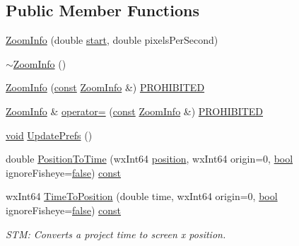 \subsection*{Public Member Functions}
\begin{DoxyCompactItemize}
\item 
\hyperlink{class_zoom_info_a873097fea0bcd18e29151c5b1ab540e1}{Zoom\+Info} (double \hyperlink{seqread_8c_ac503262ae470564980711da4f78b1181}{start}, double pixels\+Per\+Second)
\item 
\hyperlink{class_zoom_info_aa75d0466755ec5d88c0b0c83d150cb3c}{$\sim$\+Zoom\+Info} ()
\item 
\hyperlink{class_zoom_info_a96347b04310289f36523d976241681c3}{Zoom\+Info} (\hyperlink{getopt1_8c_a2c212835823e3c54a8ab6d95c652660e}{const} \hyperlink{class_zoom_info}{Zoom\+Info} \&) \hyperlink{_theme_8cpp_a035607ad9a746b2bf967980a50dd35db}{P\+R\+O\+H\+I\+B\+I\+T\+ED}
\item 
\hyperlink{class_zoom_info}{Zoom\+Info} \& \hyperlink{class_zoom_info_a9d29194b0340b81505c537409481bd4c}{operator=} (\hyperlink{getopt1_8c_a2c212835823e3c54a8ab6d95c652660e}{const} \hyperlink{class_zoom_info}{Zoom\+Info} \&) \hyperlink{_theme_8cpp_a035607ad9a746b2bf967980a50dd35db}{P\+R\+O\+H\+I\+B\+I\+T\+ED}
\item 
\hyperlink{sound_8c_ae35f5844602719cf66324f4de2a658b3}{void} \hyperlink{class_zoom_info_a526e25124bc79b115e8c72d921e56b70}{Update\+Prefs} ()
\item 
double \hyperlink{class_zoom_info_aa7e0fefa3365826150c253c1ba6e4339}{Position\+To\+Time} (wx\+Int64 \hyperlink{structposition}{position}, wx\+Int64 origin=0, \hyperlink{mac_2config_2i386_2lib-src_2libsoxr_2soxr-config_8h_abb452686968e48b67397da5f97445f5b}{bool} ignore\+Fisheye=\hyperlink{mac_2config_2i386_2lib-src_2libsoxr_2soxr-config_8h_a65e9886d74aaee76545e83dd09011727}{false}) \hyperlink{getopt1_8c_a2c212835823e3c54a8ab6d95c652660e}{const} 
\item 
wx\+Int64 \hyperlink{class_zoom_info_af5b3ea2d31e53b203a06d13d4afd7f90}{Time\+To\+Position} (double time, wx\+Int64 origin=0, \hyperlink{mac_2config_2i386_2lib-src_2libsoxr_2soxr-config_8h_abb452686968e48b67397da5f97445f5b}{bool} ignore\+Fisheye=\hyperlink{mac_2config_2i386_2lib-src_2libsoxr_2soxr-config_8h_a65e9886d74aaee76545e83dd09011727}{false}) \hyperlink{getopt1_8c_a2c212835823e3c54a8ab6d95c652660e}{const} 
\begin{DoxyCompactList}\small\item\em S\+TM\+: Converts a project time to screen x position. \end{DoxyCompactList}\item 

\end{DoxyCompactItemize}
